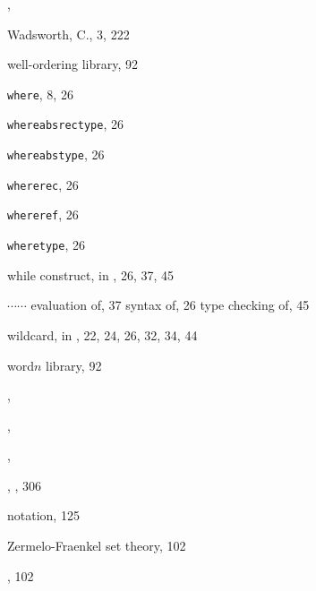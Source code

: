 \begin{theindex}
  \item {}, 
  \item Wadsworth, C., 3, 222
  \item well-ordering library, 92
  \item {\small\verb+where+}, 8, 26
  \item {\small\verb+whereabsrectype+}, 26
  \item {\small\verb+whereabstype+}, 26
  \item {\small\verb+whererec+}, 26
  \item {\small\verb+whereref+}, 26
  \item {\small\verb+wheretype+}, 26
  \item while construct, in \ML, 26, 37, 45
  \item {\small{}$\cdots$$\cdots$}
    \subitem evaluation of, 37
    \subitem syntax of, 26
    \subitem type checking of, 45
  \item wildcard, in \ML, 22, 24, 26, 32, 34, 44
  \item word$n$ library, 92
  \item {}, 
  \item {}, 
  \item {}, 

  \indexspace

  \item {}, , 306

  \indexspace

  \item {} notation, 125
  \item Zermelo-Fraenkel set theory, 102
  \item {}, 102

\end{theindex}

